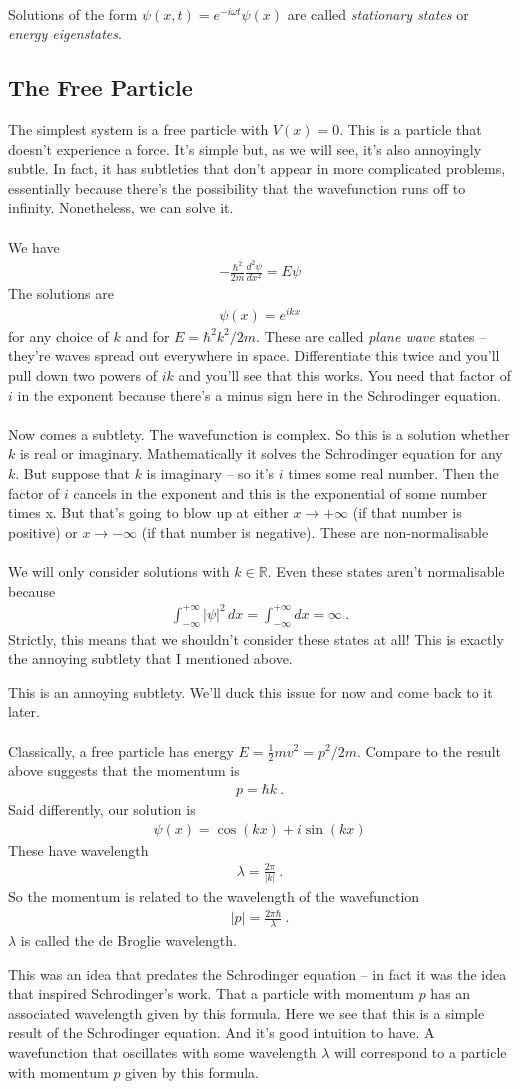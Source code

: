 \documentclass[12pt]{article}
\def\be{\begin{eqnarray}}
\def\ee{\end{eqnarray}}
\newcommand{\nn}{\nonumber}
\newcommand\para{\paragraph{}}
\newcommand{\ft}[2]{{\textstyle\frac{#1}{#2}}}
\newcommand{\ra}{\rightarrow}
\newcommand{\R}{{\mathds R}}
\begin{document}
\para
{\color{olive} Solutions of the form $\psi(x,t) = e^{-i\omega t}\psi(x)$ are called {\it stationary states} or {\it energy eigenstates}. }


\subsection{The Free Particle}

{\color{olive} The simplest system is a free particle with $V(x)=0$.} This is a particle that doesn't experience a force. It's simple but, as we will see, it's also annoyingly subtle. In fact, it has subtleties that don't appear in more complicated problems, essentially because there's the possibility that the wavefunction runs off to infinity. Nonetheless, we can solve it. 

\para
{\color{olive} We have
\be -\frac{\hbar^2}{2m} \frac{d^2\psi}{dx^2} = E\psi\nn\ee
%
The solutions are
%
\be \psi(x) = e^{ikx} \nn\ee
%
for any choice of $k$ and for $E=\hbar^2 k^2/2m$. These are called {\it plane wave} states -- they're waves spread out everywhere in space.} Differentiate this twice and you'll pull down two powers of $ik$ and you'll see that this works. You need that factor of $i$ in the exponent because there's a minus sign here in the Schrodinger equation.

\para
Now comes a subtlety. The wavefunction is complex. So this is a solution whether $k$ is real or imaginary. Mathematically it solves the Schrodinger equation for any $k$. But suppose that $k$ is imaginary -- so it's $i$ times some real number. Then the factor of $i$ cancels in the exponent and this is the exponential of some number times x. But that's going to blow up at either $x\ra +\infty$ (if that number is positive) or $x\ra -\infty$ (if that number is negative).  These are non-normalisable 

\para
{\color{olive} We will only consider solutions with $k\in \R$. Even these states aren't normalisable because
%
\be \int_{-\infty}^{+\infty} |\psi|^2\,dx = \int_{-\infty}^{+\infty} dx = \infty\ .\nn\ee
%
} Strictly, this means that we shouldn't consider these states at all! This is exactly the annoying subtlety that I mentioned above.  {\color{olive}This is an annoying subtlety. We'll duck this issue for now and come back to it later.

\para
Classically, a free particle has energy $E= \ft12 mv^2 = p^2/2m$. Compare to the result above suggests that the momentum is
%
\be p = \hbar k\ .\nn\ee
%
Said differently, our solution is
%
\be \psi(x) = \cos(kx) + i\sin(kx)\nn\ee
%
These have wavelength
%
\be \lambda = \frac{2\pi}{|k|}\ .\nn\ee
%
So the momentum is related to the wavelength of the wavefunction
%
\be |p| = \frac{2\pi\hbar}{\lambda}\ .\nn\ee
%
$\lambda$ is called the de Broglie wavelength.}  This was an idea that predates the Schrodinger equation -- in fact it was the idea that inspired Schrodinger's work. That a particle with momentum $p$ has an associated wavelength given by this formula. Here we see that this is a simple result of the Schrodinger equation. And it's good intuition to have. A wavefunction that oscillates with some wavelength $\lambda$ will correspond to a particle with momentum $p$ given by this formula. 
\end{document}
